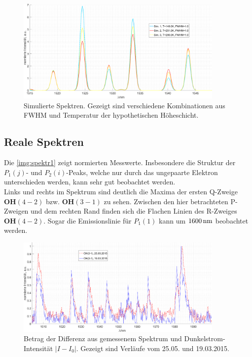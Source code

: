 \documentclass[numbers=noenddot,a4paper,notitlepage,twoside,BCOR15mm]{scrartcl}
\newcommand{\ix}[1]{_\text{#1}}
\newcommand{\fett}[1]{\textbf{#1}}
\begin{document}
				\begin{figure}[h]
					\centering
					\includegraphics[width=0.9\textwidth]{sim_spektr.png}
					\caption{Simulierte Spektren. Gezeigt sind verschiedene Kombinationen aus FWHM und Temperatur der hypothetischen Höheschicht.}
					\label{img:sim}
				\end{figure}

		\subsection{Reale Spektren}

			Die \autoref{img:spektr1} zeigt normierten Messwerte. Insbesondere die Struktur der $P\ix{1}(j)$- und $P\ix{2}(i)$-Peaks, welche nur durch das ungepaarte Elektron unterschieden werden, kann sehr gut beobachtet werden.\\
			Links und rechts im Spektrum sind deutlich die Maxima der ersten Q-Zweige $\fett{OH}(4-2)$ bzw. $\fett{OH}(3-1)$ zu sehen. Zwischen den hier betrachteten P-Zweigen und dem rechten Rand finden sich die Flachen Linien des R-Zweiges $\fett{OH}(4-2)$. Sogar die Emissionslinie für $P\ix{1}(1)$ kann um $\unit[1600]{nm}$ beobachtet werden.

				\begin{figure}
					\centering
					\includegraphics[width=0.9\textwidth]{spektr_unsmooth.png}
					\caption{Betrag der Differenz aus gemessenem Spektrum und Dunkelstrom-Intensität $|I-I\ix{0}|$. Gezeigt sind Verläufe vom 25.05. und 19.03.2015.}
					\label{img:spektr1}
				\end{figure}
\end{document}
